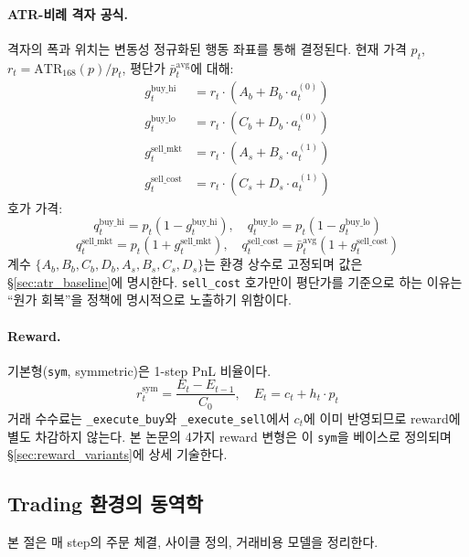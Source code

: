 \documentclass[11pt, a4paper]{article}
\begin{document}
\paragraph{ATR-비례 격자 공식.}
격자의 폭과 위치는 변동성 정규화된 행동 좌표를 통해 결정된다. 현재 가격 $p_t$,
$r_t = \mathrm{ATR}_{168}(p) / p_t$, 평단가 $\bar{p}^{\mathrm{avg}}_t$에 대해:
\begin{align}
g^{\mathrm{buy\_hi}}_t  &= r_t \cdot (A_b + B_b \cdot a_t^{(0)}) \\
g^{\mathrm{buy\_lo}}_t  &= r_t \cdot (C_b + D_b \cdot a_t^{(0)}) \\
g^{\mathrm{sell\_mkt}}_t &= r_t \cdot (A_s + B_s \cdot a_t^{(1)}) \\
g^{\mathrm{sell\_cost}}_t &= r_t \cdot (C_s + D_s \cdot a_t^{(1)})
\end{align}
호가 가격:
\begin{equation}
q^{\mathrm{buy\_hi}}_t  = p_t (1 - g^{\mathrm{buy\_hi}}_t), \quad
q^{\mathrm{buy\_lo}}_t  = p_t (1 - g^{\mathrm{buy\_lo}}_t)
\end{equation}
\begin{equation}
q^{\mathrm{sell\_mkt}}_t = p_t (1 + g^{\mathrm{sell\_mkt}}_t), \quad
q^{\mathrm{sell\_cost}}_t = \bar{p}^{\mathrm{avg}}_t (1 + g^{\mathrm{sell\_cost}}_t)
\end{equation}
계수 $\{A_b, B_b, C_b, D_b, A_s, B_s, C_s, D_s\}$는 환경 상수로 고정되며 값은
\S\ref{sec:atr_baseline}에 명시한다. \texttt{sell\_cost} 호가만이 평단가를 기준으로
하는 이유는 ``원가 회복''을 정책에 명시적으로 노출하기 위함이다.

\paragraph{Reward.}
기본형(\texttt{sym}, symmetric)은 1-step PnL 비율이다.
\begin{equation}
r_t^{\mathrm{sym}} = \frac{E_t - E_{t-1}}{C_0}, \quad
E_t = c_t + h_t \cdot p_t
\end{equation}
거래 수수료는 \texttt{\_execute\_buy}와 \texttt{\_execute\_sell}에서 $c_t$에 이미
반영되므로 reward에 별도 차감하지 않는다. 본 논문의 4가지 reward 변형은
이 \texttt{sym}을 베이스로 정의되며 \S\ref{sec:reward_variants}에 상세 기술한다.

\subsection{Trading 환경의 동역학}
\label{sec:env_dynamics}

본 절은 매 step의 주문 체결, 사이클 정의, 거래비용 모델을 정리한다.
\end{document}
